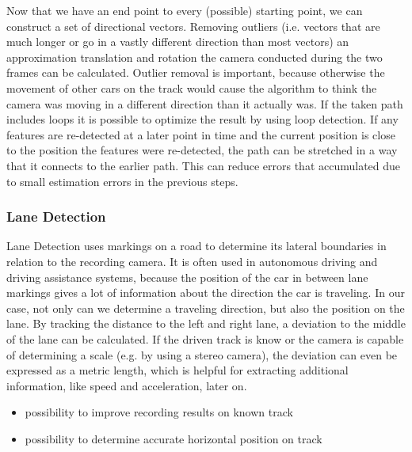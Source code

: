 Now that we have an end point to every (possible) starting point, we can construct a set of directional vectors.
Removing outliers (i.e. vectors that are much longer or go in a vastly different direction than most vectors) an approximation translation and rotation the camera conducted during the two frames can be calculated.
Outlier removal is important, because otherwise the movement of other cars on the track would cause the algorithm to think the camera was moving in a different direction than it actually was.
If the taken path includes loops it is possible to optimize the result by using loop detection. If any features are re-detected at a later point in time and the current position is close to the position the features were re-detected, the path can be stretched in a way that it connects to the earlier path.
This can reduce errors that accumulated due to small estimation errors in the previous steps.


\subsubsection{Lane Detection}
Lane Detection uses markings on a road to determine its lateral boundaries in relation to the recording camera. It is often used in autonomous driving and driving assistance systems, because the position of the car in between lane markings gives a lot of information about the direction the car is traveling. 
In our case, not only can we determine a traveling direction, but also the position on the lane.
By tracking the distance to the left and right lane, a deviation to the middle of the lane can be calculated. 
If the driven track is know or the camera is capable of determining a scale (e.g. by using a stereo camera), the deviation can even be expressed as a metric length, which is helpful for extracting additional information, like speed and acceleration, later on.


\begin{itemize}
  \item possibility to improve recording results on known track
  \item possibility to determine accurate horizontal position on track
\end{itemize}

